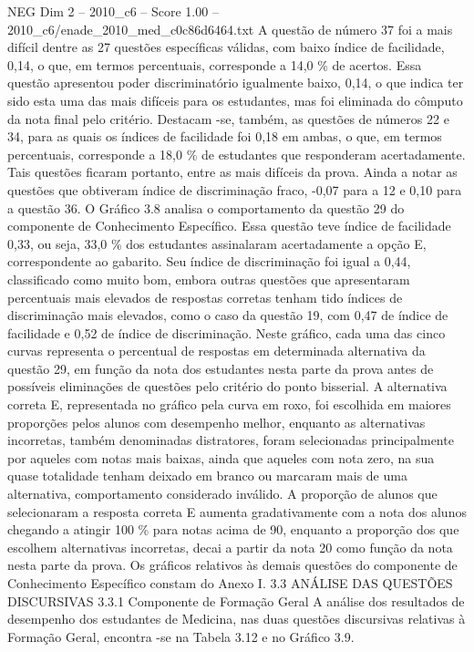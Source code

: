 \begin{textsample}{NEG Dim 2 – 2010\_c6 – Score 1.00 – 2010\_c6/enade\_2010\_med\_c0c86d6464.txt}
A questão de número 37 foi a mais difícil dentre as 27 questões específicas válidas, com baixo índice de facilidade, 0,14, o que, em termos percentuais, corresponde a 14,0 \% de acertos.
Essa questão apresentou poder discriminatório igualmente baixo, 0,14, o que indica ter sido esta uma das mais difíceis para os estudantes, mas foi eliminada do cômputo da nota final pelo critério.
Destacam -se, também, as questões de números 22 e 34, para as quais os índices de facilidade foi 0,18 em ambas, o que, em termos percentuais, corresponde a 18,0 \% de estudantes que responderam acertadamente.
Tais questões ficaram portanto, entre as mais difíceis da prova.
Ainda a notar as questões que obtiveram índice de discriminação fraco, -0,07 para a 12 e 0,10 para a questão 36.
O Gráfico 3.8 analisa o comportamento da questão 29 do componente de Conhecimento Específico.
Essa questão teve índice de facilidade 0,33, ou seja, 33,0 \% dos estudantes assinalaram acertadamente a opção E, correspondente ao gabarito.
Seu índice de discriminação foi igual a 0,44, classificado como muito bom, embora outras questões que apresentaram percentuais mais elevados de respostas corretas tenham tido índices de discriminação mais elevados, como o caso da questão 19, com 0,47 de índice de facilidade e 0,52 de índice de discriminação.
Neste gráfico, cada uma das cinco curvas representa o percentual de respostas em determinada alternativa da questão 29, em função da nota dos estudantes nesta parte da prova antes de possíveis eliminações de questões pelo critério do ponto bisserial.
A alternativa correta E, representada no gráfico pela curva em roxo, foi escolhida em maiores proporções pelos alunos com desempenho melhor, enquanto as alternativas incorretas, também denominadas distratores, foram selecionadas principalmente por aqueles com notas mais baixas, ainda que aqueles com nota zero, na sua quase totalidade tenham deixado em branco ou marcaram mais de uma alternativa, comportamento considerado inválido.
A proporção de alunos que selecionaram a resposta correta E aumenta gradativamente com a nota dos alunos chegando a atingir 100 \% para notas acima de 90, enquanto a proporção dos que escolhem alternativas incorretas, decai a partir da nota 20 como função da nota nesta parte da prova.
Os gráficos relativos às demais questões do componente de Conhecimento Específico constam do Anexo I. 3.3 ANÁLISE DAS QUESTÕES DISCURSIVAS 3.3.1 Componente de Formação Geral A análise dos resultados de desempenho dos estudantes de Medicina, nas duas questões discursivas relativas à Formação Geral, encontra -se na Tabela 3.12 e no Gráfico 3.9.

\end{textsample}
